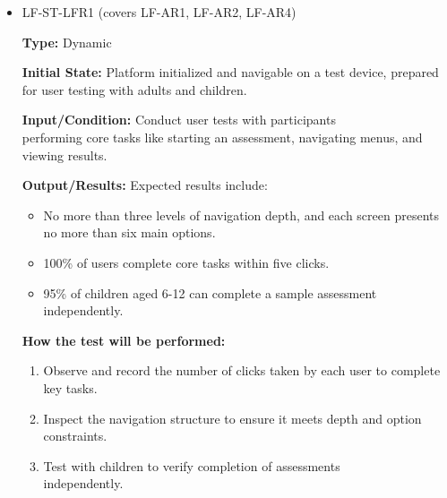 \documentclass[12pt, titlepage]{article}
\begin{document}
\begin{itemize} 
  \item LF-ST-LFR1 (covers LF-AR1, LF-AR2, LF-AR4) 
  \begin{mdframed}[linewidth=0.5mm] 
    \textbf{Type:} Dynamic \par 
    \textbf{Initial State:} Platform initialized and navigable on a test device, prepared for user testing with adults and children. \par 
    \textbf{Input/Condition:} Conduct user tests with participants \\performing core tasks like starting an assessment, navigating menus, and viewing results. \par 
    \textbf{Output/Results:} Expected results include: 
    \begin{itemize} 
      \item No more than three levels of navigation depth, and each screen presents no more than six main options. 
      \item 100\% of users complete core tasks within five clicks. 
      \item 95\% of children aged 6-12 can complete a sample assessment independently. 
    \end{itemize} \par \textbf{How the test will be performed:} 
    \begin{enumerate}[noitemsep] 
      \item Observe and record the number of clicks taken by each user to complete key tasks. 
      \item Inspect the navigation structure to ensure it meets depth and option constraints. 
      \item Test with children to verify completion of assessments \\independently. 
    \end{enumerate} 
  \end{mdframed}


\end{itemize}
\end{document}
